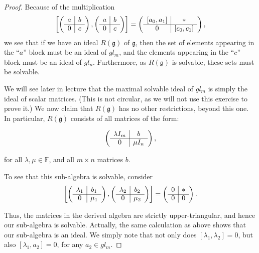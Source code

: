 \documentclass{amsart}
\newcommand*{\g}{\mathfrak{g}}
\begin{document}
\begin{proof}  Because of the multiplication
$$ \left[ \left( \begin{array}{c|c}
a & b \\ \cline{1-2} 
0 & c 
\end{array}\right) , \left( \begin{array}{c|c}
a & b \\ \cline{1-2} 
0 & c 
\end{array}\right) \right] = \left( \begin{array}{c|c}
[a_{0},a_{1}] & * \\ \cline{1-2} 
0 & [c_{0},c_{1}] 
\end{array}\right),$$
we see that if we have an ideal $R(\g)$ of $\g$, then the set of
elements appearing in the ``$a$'' block must be an ideal of $gl_{m}$,
and the elements appearing in the ``$c$'' block must be an ideal of
$gl_{n}$.  Furthermore, as $R(\g)$ is solvable, these sets must be
solvable.  

We will see later in lecture that the maximal solvable ideal of
$gl_{m}$ is simply the ideal of scalar matrices.  (This is not
circular, as we will not use this exercise to prove it.)  We now claim
that $R(\g)$ has no other restrictions, beyond this one.  In
particular, $R(\g)$ consists of all matrices of the form:

$$\left( \begin{array}{c|c}
\lambda I_{m} & b \\ \cline{1-2} 
0 & \mu I_{n} 
\end{array}\right),$$

\noindent
for all $\lambda, \mu \in \mathbb{F}$, and all $m \times n$ matrices
$b$.

To see that this sub-algebra is solvable, consider
$$ \left[ \left( \begin{array}{c|c}
\lambda_{1} & b_{1} \\ \cline{1-2} 
0 & \mu_{1} 
\end{array}\right) , \left( \begin{array}{c|c}
\lambda_{2} & b_{2} \\ \cline{1-2} 
0 & \mu_{2} 
\end{array}\right) \right] = \left( \begin{array}{c|c}
0 & * \\ \cline{1-2} 
0 & 0 
\end{array}\right).$$

Thus, the matrices in the derived algebra are strictly
upper-triangular, and hence our sub-algebra is solvable.  Actually,
the same calculation as above shows that our sub-algebra is an ideal.
We simply note that not only does $[\lambda_{1}, \lambda_{2}] = 0$,
but also $[\lambda_{1}, a_{2}] = 0$, for any $a_{2} \in gl_{m}$.


\end{proof}
\end{document}
